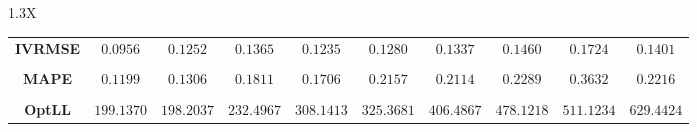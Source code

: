\documentclass[10pt]{article}
\begin{document}
{\begin{tabularx}{1.3\textwidth}{X}
{\begin{tabular}{cccccccccc}
 { {\bf IVRMSE} }& $0.0956$ & $0.1252$ & $0.1365$ & $0.1235$ & $0.1280$ & $0.1337$ & $0.1460$& $0.1724$& $0.1401$ \\
\cmidrule(r){1-10} \\
 { {\bf MAPE} }& $0.1199$ & $0.1306$ & $0.1811$ & $0.1706$ & $0.2157$ & $0.2114$ & $0.2289$& $0.3632$& $0.2216$ \\
\cmidrule(r){1-10} \\
 { {\bf OptLL} }& $199.1370$ & $198.2037$ & $232.4967$ & $308.1413$ & $325.3681$ & $406.4867$ & $478.1218$& $511.1234$& $629.4424$ \\
\bottomrule
\end{tabular}}
\end{tabularx}}

  \vspace{3 cm}

  
\end{document}
